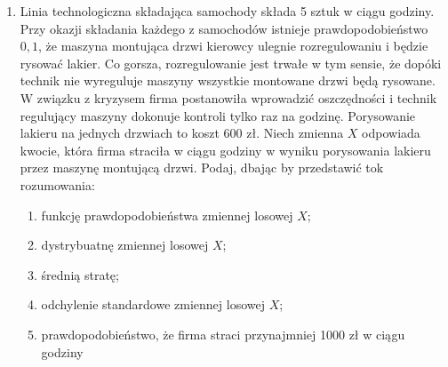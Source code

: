 \documentclass{mwart}
\begin{document}
\begin{enumerate}
\begin{enumerate}
\end{enumerate}
\item Linia technologiczna składająca samochody składa 5 sztuk w ciągu godziny. Przy okazji składania każdego
z samochodów istnieje prawdopodobieństwo $0{,}1$, że maszyna montująca drzwi kierowcy ulegnie rozregulowaniu
i będzie rysować lakier. Co gorsza, rozregulowanie jest trwałe w tym sensie, że dopóki technik nie wyreguluje
maszyny wszystkie montowane drzwi będą rysowane. W związku z kryzysem firma postanowiła wprowadzić
oszczędności i technik regulujący maszyny dokonuje kontroli tylko raz na godzinę. Porysowanie lakieru na jednych
drzwiach to koszt 600 zł. Niech zmienna $X$ odpowiada kwocie, która firma straciła w ciągu godziny w wyniku
porysowania lakieru przez maszynę montującą drzwi. Podaj, dbając by przedstawić tok rozumowania:
\begin{enumerate}
\item funkcję prawdopodobieństwa zmiennej losowej $X$;
\item dystrybuatnę zmiennej losowej $X$;
\item średnią stratę;
\item odchylenie standardowe zmiennej losowej $X$;
\item prawdopodobieństwo, że firma straci przynajmniej 1000 zł w ciągu godziny
\end{enumerate}
\end{enumerate}

\clearpage
\end{document}
